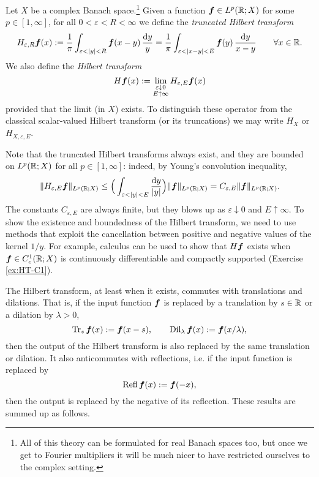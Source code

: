 \begin{defn}
  Let $X$ be a complex Banach space.\footnote{All of this theory can be formulated for real Banach spaces too, but once we get to Fourier multipliers it will be much nicer to have restricted ourselves to the complex setting.}
  Given a function $\bm{f} \in L^p(\mathbb{R};X)$ for some $p \in [1,\infty]$, for all $0 < \varepsilon < R < \infty$ we define the \emph{truncated Hilbert transform}
  \begin{equation*}
    H_{\varepsilon,R} \bm{f}(x) :=  \frac{1}{\pi} \int_{\varepsilon < |y| < R} \bm{f}(x-y) \, \frac{\mathrm{d} y}{y} =  \frac{1}{\pi} \int_{\varepsilon < |x-y| < E} \bm{f}(y) \, \frac{\mathrm{d} y}{x-y} \qquad \forall x \in \mathbb{R}.
  \end{equation*}
  We also define the \emph{Hilbert transform}
  \begin{equation*}
    H\bm{f}(x) := \lim_{\substack{\varepsilon \downarrow 0 \\ E \uparrow \infty}} H_{\varepsilon,E}\bm{f}(x)
  \end{equation*}
  provided that the limit (in $X$) exists.
  To distinguish these operator from the classical scalar-valued Hilbert transform (or its truncations) we may write $H_{X}$ or $H_{X, \varepsilon, E}$.
\end{defn}

Note that the truncated Hilbert transforms always exist, and they are bounded on $L^p(\mathbb{R};X)$ for all $p \in [1,\infty]$: indeed, by Young's convolution inequality,
\begin{equation*}
  \|H_{\varepsilon,E} \bm{f}\|_{L^p(\mathbb{R};X)} \leq \Big( \int_{\varepsilon < |y| < E} \frac{\mathrm{d} y}{|y|} \Big) \|\bm{f}\|_{L^p(\mathbb{R};X)} = C_{\varepsilon,E}  \|\bm{f}\|_{L^p(\mathbb{R};X)}.
\end{equation*}
The constants $C_{\varepsilon,E}$ are always finite, but they blows up as $\varepsilon \downarrow 0$ and $E \uparrow \infty$.
To show the existence and boundedness of the Hilbert transform, we need to use methods that exploit the cancellation between positive and negative values of the kernel $1/y$.
For example, calculus can be used to show that $H\bm{f}$ exists when $\bm{f} \in C_{c}^1(\mathbb{R};X)$ is continuously differentiable and compactly supported (Exercise \ref{ex:HT-C1}).

The Hilbert transform, at least when it exists, commutes with translations and dilations.
That is, if the input function $\bm{f}$ is replaced by a translation by $s \in \mathbb{R}$ or a dilation by $\lambda > 0$,
\begin{equation*}
  \operatorname{Tr}_{s} \bm{f} (x) := \bm{f}(x - s), \qquad \operatorname{Dil}_{\lambda} \bm{f}(x) := \bm{f}(x/\lambda), 
\end{equation*}
then the output of the Hilbert transform is also replaced by the same translation or dilation.
It also anticommutes with reflections, i.e. if the input function is replaced by
\begin{equation*}
  \operatorname{Refl} \bm{f}(x) := \bm{f}(-x),
\end{equation*}
then the output is replaced by the negative of its reflection.
These results are summed up as follows.

